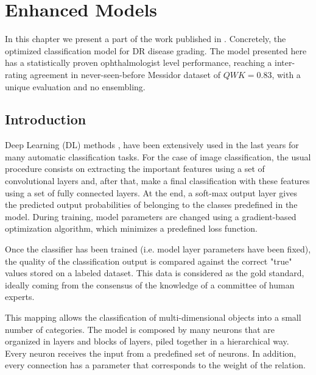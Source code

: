 
\chapter{Enhanced Models} %

\label{Chapter:Ordinal_Regression} %

In this chapter we present a part of the work published in \citep{de2017deep}. Concretely, the optimized classification model for DR disease grading. The model presented here has a statistically proven ophthalmologist level performance, reaching a inter-rating agreement in never-seen-before Messidor dataset of $QWK = 0.83$, with a unique evaluation and no ensembling. 


\section{Introduction}

Deep Learning (DL) methods \citep{nature-deep-learning}, \citep{888} have been extensively used in the last years for many automatic classification tasks. For the case of image classification, the usual procedure consists on extracting the important features using a set of convolutional layers and, after that, make a final classification with these features using a set of fully connected layers. At the end, a soft-max output layer gives the predicted output probabilities of belonging to the classes predefined in the model. During training, model parameters are changed using a gradient-based optimization algorithm, which minimizes a predefined loss function.\citep{Goodfellow-et-al-2016} 

Once the classifier has been trained (i.e. model layer parameters have been fixed), the quality of the classification output is compared against the correct "true" values stored on a labeled dataset. This data is considered as the gold standard, ideally coming from the consensus of the knowledge of a committee of human experts.

This mapping allows the classification of multi-dimensional objects into a small number of categories. The model is composed by many neurons that are organized in layers and blocks of layers, piled together in a hierarchical way. Every neuron receives the input from a predefined set of neurons. In addition, every connection has a parameter that corresponds to the weight of the relation. 

